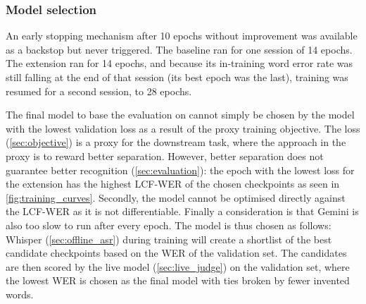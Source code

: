   \subsubsection{Model selection}
    An early stopping mechanism after 10 epochs without improvement was available as a backstop but never triggered. The baseline ran for one session of 14 epochs. The extension ran for 14 epochs, and because its in-training word error rate was still falling at the end of that session (its best epoch was the last), training was resumed for a second session, to 28 epochs.

  The final model to base the evaluation on cannot simply be chosen by the model with the lowest validation loss as a result of the proxy training objective. The loss (\autoref{sec:objective}) is a proxy for the downstream task, where the approach in the proxy is to reward better separation. However, better separation does not guarantee better recognition (\autoref{sec:evaluation}): the epoch with the lowest loss for the extension has the highest LCF-WER of the chosen checkpoints as seen in \autoref{fig:training_curves}. Secondly, the model cannot be optimised directly against the LCF-WER as it is not differentiable. Finally a consideration is that Gemini is also too slow to run after every epoch. The model is thus chosen as follows: Whisper (\autoref{sec:offline_asr}) during training will create a shortlist of the best candidate checkpoints based on the WER of the validation set. The candidates are then scored by the live model (\autoref{sec:live_judge}) on the validation set, where the lowest WER is chosen as the final model with ties broken by fewer invented words. 

